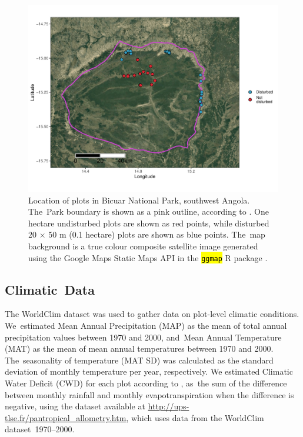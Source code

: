 \documentclass[diversity,article,accept,moreauthors,pdftex]{Definitions/mdpi}
\begin{document}
\begin{figure}[H]
\centering
	\includegraphics[width=\textwidth]{img/bicuar_map}
	\caption{Location of plots in Bicuar National Park, southwest Angola. The~Park boundary is shown as a pink outline, according to \citet{WDPA2019}. One hectare undisturbed plots are shown as red points, while disturbed 20 $\times$ 50 m (0.1 hectare) plots are shown as blue points. The~map background is a true colour composite satellite image generated using the Google Maps Static Maps API in the \hl{\texttt{ggmap}} %
	R package \citep{ggmap}.}
	\label{bicuar_map}
\end{figure}
\unskip

\subsection{Climatic~Data}

The WorldClim dataset \citep{Fick2017} was used to gather data on plot-level climatic conditions. We~estimated Mean Annual Precipitation (MAP) as the mean of total annual precipitation values between 1970 and 2000, and~Mean Annual Temperature (MAT) as the mean of mean annual temperatures between 1970 and 2000. The~seasonality of temperature (MAT SD) was calculated as the standard deviation of monthly temperature per year, respectively. We estimated Climatic Water Deficit (CWD) for each plot according to \citet{Chave2014}, as~the sum of the difference between monthly rainfall and monthly evapotranspiration when the difference is negative, using the dataset available at \url{http://ups-tlse.fr/pantropical_allometry.htm}, which uses data from the WorldClim dataset~1970--2000.
\end{document}
